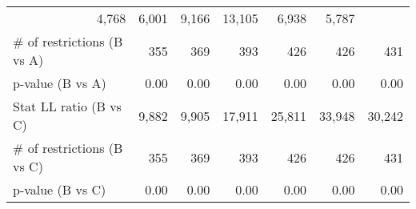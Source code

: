 \begin{tabular}{lllllll}
  \multicolumn{1}{|r}{4,768} &
  \multicolumn{1}{r}{6,001} &
  \multicolumn{1}{r}{9,166} &
  \multicolumn{1}{r}{13,105} &
  \multicolumn{1}{r}{6,938} &
  \multicolumn{1}{r}{5,787} \\
\multicolumn{1}{l}{\hspace{1em}$\#$ of restrictions (B vs A)} &
  \multicolumn{1}{|r}{355} &
  \multicolumn{1}{r}{369} &
  \multicolumn{1}{r}{393} &
  \multicolumn{1}{r}{426} &
  \multicolumn{1}{r}{426} &
  \multicolumn{1}{r}{431} \\
\multicolumn{1}{l}{\hspace{1em}p-value (B vs A)} &
  \multicolumn{1}{|r}{0.00} &
  \multicolumn{1}{r}{0.00} &
  \multicolumn{1}{r}{0.00} &
  \multicolumn{1}{r}{0.00} &
  \multicolumn{1}{r}{0.00} &
  \multicolumn{1}{r}{0.00} \\
\multicolumn{1}{l}{\hspace{1em}Stat LL ratio (B vs C)} &
  \multicolumn{1}{|r}{9,882} &
  \multicolumn{1}{r}{9,905} &
  \multicolumn{1}{r}{17,911} &
  \multicolumn{1}{r}{25,811} &
  \multicolumn{1}{r}{33,948} &
  \multicolumn{1}{r}{30,242} \\
\multicolumn{1}{l}{\hspace{1em}$\#$ of restrictions (B vs C)} &
  \multicolumn{1}{|r}{355} &
  \multicolumn{1}{r}{369} &
  \multicolumn{1}{r}{393} &
  \multicolumn{1}{r}{426} &
  \multicolumn{1}{r}{426} &
  \multicolumn{1}{r}{431} \\
\multicolumn{1}{l}{\hspace{1em}p-value (B vs C)} &
  \multicolumn{1}{|r}{0.00} &
  \multicolumn{1}{r}{0.00} &
  \multicolumn{1}{r}{0.00} &
  \multicolumn{1}{r}{0.00} &
  \multicolumn{1}{r}{0.00} &
  \multicolumn{1}{r}{0.00} \\
\cline{1-7}
\end{tabular}
